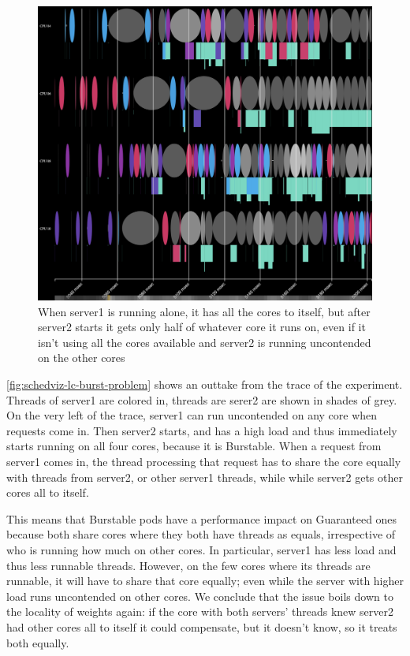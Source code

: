 \begin{figure}[t]
    \centering
    \includegraphics[width=\columnwidth]{graphs/schedviz-lc-burst-problem.png}
    \caption{When server1 is running alone, it has all the cores to itself, but
    after server2 starts it gets only half of whatever core it runs on, even if
    it isn't using all the cores available and server2 is running uncontended on
    the other cores}\label{fig:schedviz-lc-burst-problem}
\end{figure}

\autoref{fig:schedviz-lc-burst-problem} shows an outtake from the trace of the
experiment. Threads of server1 are colored in, threads are serer2 are shown in
shades of grey. On the very left of the trace, server1 can run uncontended on
any core when requests come in. Then server2 starts, and has a high load and
thus immediately starts running on all four cores, because it is Burstable. When
a request from server1 comes in, the thread processing that request has to share
the core equally with threads from server2, or other server1 threads, while
while server2 gets other cores all to itself.

This means that Burstable pods have a performance impact on Guaranteed ones
because both share cores where they both have threads as equals, irrespective of
who is running how much on other cores. In particular, server1 has less load and
thus less runnable threads. However, on the few cores where its threads are
runnable, it will have to share that core equally; even while the server with
higher load runs uncontended on other cores. We conclude that the issue boils
down to the locality of weights again: if the core with both servers' threads
knew server2 had other cores all to itself it could compensate, but it doesn't
know, so it treats both equally.


